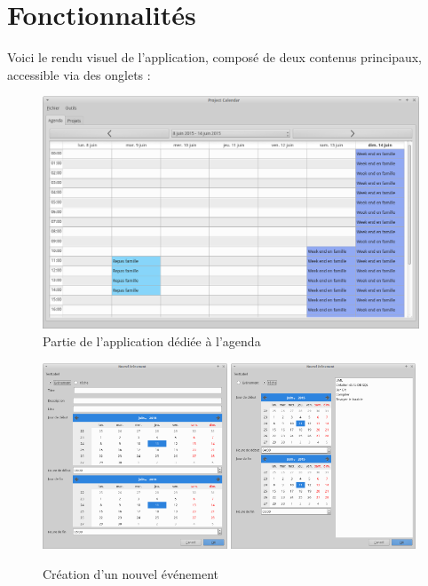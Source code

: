 \chapter{Fonctionnalités}

\noindent Voici le rendu visuel de l'application, composé de deux contenus principaux, accessible via des onglets :

\begin{figure}[h!]
  \centering
    \includegraphics[width=1.0\textwidth]{assets/screen_agenda.png}
    \caption{Partie de l'application dédiée à l'agenda}
\end{figure}

\begin{figure}[h!]
  \centering
    \includegraphics[width=0.49\textwidth]{assets/screen_event.png}
    \includegraphics[width=0.49\textwidth]{assets/screen_event_tache.png}
    \caption{Création d'un nouvel événement}
\end{figure}

